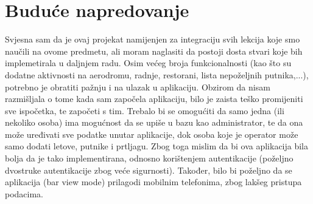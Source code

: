 \chapter{Buduće napredovanje}

Svjesna sam da je ovaj projekat namijenjen za integraciju svih lekcija koje smo naučili na ovome predmetu, ali moram naglasiti da postoji dosta stvari koje bih implemetirala u daljnjem radu. Osim većeg broja funkcionalnosti (kao što su dodatne aktivnosti na aerodromu, radnje, restorani, lista nepoželjnih putnika,...), potrebno je obratiti pažnju i na ulazak u aplikaciju. Obzirom da nisam razmišljala o tome kada sam započela aplikaciju, bilo je zaista teško promijeniti sve ispočetka, te započeti s tim. Trebalo bi se omogućiti da samo jedna (ili nekoliko osoba) ima mogućnost da se upiše u bazu kao administrator, te da ona može uređivati sve podatke unutar aplikacije, dok osoba koje je operator može samo dodati letove, putnike i prtljagu. Zbog toga mislim da bi ova aplikacija bila bolja da je tako implementirana, odnosno korištenjem autentikacije (poželjno dvostruke autentikacije zbog veće sigurnosti). Također, bilo bi poželjno da se aplikacija (bar view mode) prilagodi mobilnim telefonima, zbog lakšeg pristupa podacima.
